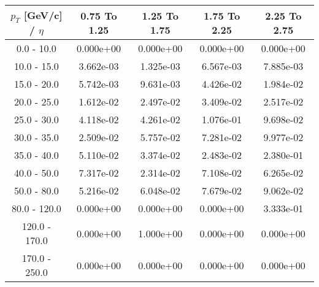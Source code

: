 \begin{tabular}{|c|c|c|c|c|}\hline 
$p_T$ [GeV/c] / $\eta$  & 0.75 To 1.25 & 1.25 To 1.75 & 1.75 To 2.25 & 2.25 To 2.75 \\ 
 \hline 
0.0 - 10.0 & 0.000e+00 & 0.000e+00 & 0.000e+00 & 0.000e+00 \\ 
10.0 - 15.0 & 3.662e-03 & 1.325e-03 & 6.567e-03 & 7.885e-03 \\ 
15.0 - 20.0 & 5.742e-03 & 9.631e-03 & 4.426e-02 & 1.984e-02 \\ 
20.0 - 25.0 & 1.612e-02 & 2.497e-02 & 3.409e-02 & 2.517e-02 \\ 
25.0 - 30.0 & 4.118e-02 & 4.261e-02 & 1.076e-01 & 9.698e-02 \\ 
30.0 - 35.0 & 2.509e-02 & 5.757e-02 & 7.281e-02 & 9.977e-02 \\ 
35.0 - 40.0 & 5.110e-02 & 3.374e-02 & 2.483e-02 & 2.380e-01 \\ 
40.0 - 50.0 & 7.317e-02 & 2.314e-02 & 7.108e-02 & 6.265e-02 \\ 
50.0 - 80.0 & 5.216e-02 & 6.048e-02 & 7.679e-02 & 9.062e-02 \\ 
80.0 - 120.0 & 0.000e+00 & 0.000e+00 & 0.000e+00 & 3.333e-01 \\ 
120.0 - 170.0 & 0.000e+00 & 1.000e+00 & 0.000e+00 & 0.000e+00 \\ 
170.0 - 250.0 & 0.000e+00 & 0.000e+00 & 0.000e+00 & 0.000e+00 \\ 
 \hline 
\end{tabular} 
